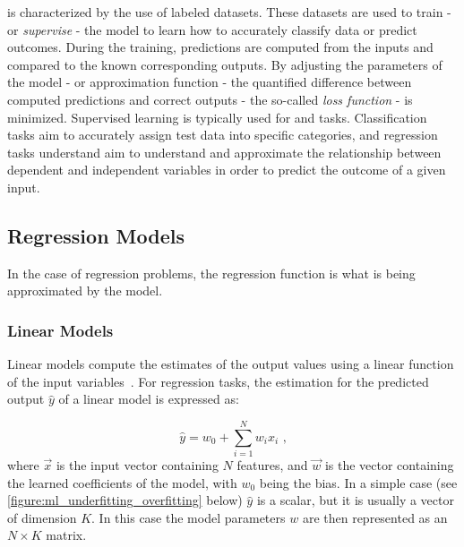  is characterized by the use of labeled datasets.
These datasets are used to train - or \textit{supervise} - the model to learn how to accurately classify data or predict outcomes.
During the training, predictions are computed from the inputs and compared to the known corresponding outputs.
By adjusting the parameters of the model - or approximation function - the quantified difference between computed predictions and correct outputs - the so-called \textit{loss function} - is minimized.
Supervised learning is typically used for  and  tasks.
Classification tasks aim to accurately assign test data into specific categories, and regression tasks understand aim to understand and approximate the relationship between dependent and independent variables in order to predict the outcome of a given input.

\subsection{Regression Models}

In the case of regression problems, the regression function is what is being approximated by the model.

\subsubsection*{Linear Models}

Linear models compute the estimates of the output values using a linear function of the input variables~\cite{PNAS:Lai:Strong_Consistency_Least_Squares_Estimates_Regression_Models}.
For regression tasks, the estimation for the predicted output \(\hat{y}\) of a linear model is expressed as:

\begin{equation}
    \hat{y} = w_0 + \sum_{i=1}^{N} w_i x_i \text{ ,}
    \label{equation:linear_regression_prediction}
\end{equation}
where \(\vec{x}\) is the input vector containing \(N\) features, and \(\vec{w}\) is the vector containing the learned coefficients of the model, with \(w_0\) being the bias.
In a simple case (see \cref{figure:ml_underfitting_overfitting} below) \(\hat{y}\) is a scalar, but it is usually a vector of dimension \(K\).
In this case the model parameters \(w\) are then represented as an \(N \times K\) matrix.

